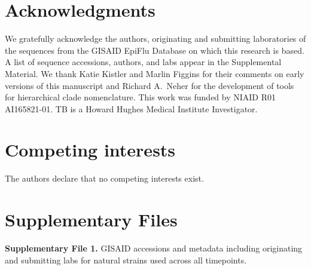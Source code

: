 \documentclass[9pt,lineno]{elife}
\begin{document}
\section*{Acknowledgments}

We gratefully acknowledge the authors, originating and submitting laboratories of the sequences from the GISAID EpiFlu Database \citep{gisaid} on which this research is based.
A list of sequence accessions, authors, and labs appear in the Supplemental Material.
We thank Katie Kistler and Marlin Figgins for their comments on early versions of this manuscript and Richard A.\ Neher for the development of tools for hierarchical clade nomenclature.
This work was funded by NIAID R01 AI165821-01.
TB is a Howard Hughes Medical Institute Investigator.

\section*{Competing interests}

The authors declare that no competing interests exist.

\section*{Supplementary Files}

\textbf{Supplementary File 1.} GISAID accessions and metadata including originating and submitting labs for natural strains used across all timepoints.


\end{document}
